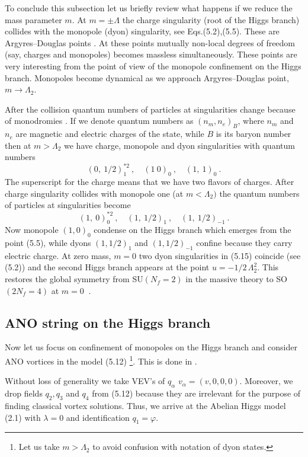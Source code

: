 \documentclass[a4paper,12pt]{article}
\begin{document}
To conclude this subsection let us briefly review what happens if
we reduce the mass parameter $m$. At $m=\pm\Lambda$ the charge
singularity (root of the Higgs branch) collides with the monopole
(dyon) singularity, see Eqs.(5.2),(5.5). These are
Argyres--Douglas points \cite{AD,APSW}. At these points mutually
non-\-local degrees of freedom (say, charges and monopoles)
becomes massless simultaneously. These points are very
interesting from the point of view of the monopole confinement on
the Higgs branch. Mono\-pol\-es become
dynamical as we approach Argyres--Douglas point, $m\to\Lambda_2$.

After the collision quantum numbers of particles at
singularities change because of monodromies \cite{SW2}. If we
denote quantum numbers as $(n_m,n_e)_B$, where $n_m$ and $n_e$
are magnetic and electric charges of the state, while $B$ is its
baryon number then at $m>\Lambda_2$ we have charge, monopole and
dyon singularities with quantum numbers
\begin{equation}
(0,\ 1/2)^{*2}_1\ , \quad (1\ 0)_0\ , \quad (1,\ 1)_0\ .
\end{equation}
The superscript for the charge means that we have two flavors
of charges. After charge singularity collides with monopole one
(at $m<\Lambda_2)$ the quantum numbers of particles at
singularities become \cite{BF}
\begin{equation}
(1,\ 0)^{*2}_0\ , \quad (1,\ 1/2)_1\ , \quad (1,\ 1/2)_{-1}\ .
\end{equation}
Now monopole $(1,0)_0$ condense on the Higgs branch which
emerges from the point (5.5), while dyons $(1,1/2)_1$ and
$(1,1/2)_{-1}$ confine because they carry electric
charge. At
zero mass, $m=0$ two dyon singularities in (5.15) coincide (see
(5.2)) and the second Higgs branch appears at the point
$u=-1/2\,\Lambda^2_2$. This restores the global symmetry from
SU$(N_f=2)$ in the massive theory to SO$(2N_f=4)$ at $m=0\ $
\cite{SW2}.

\subsection{ANO string on the Higgs branch}

Now let us focus on confinement of monopoles on the Higgs branch
and consider ANO vortices in the model (5.12) 
\footnote{ Let us take
$m>\Lambda_2$ to avoid confusion with notation of dyon states.}.
This is done in \cite{Y}.

Without loss of generality we take VEV's of $q_\alpha$
$v_\alpha=(v,0,0,0)$. Moreover, we drop fields $q_2,q_3$ and
$q_4$ from (5.12) because they are irrelevant for the purpose of
finding classical vortex solutions. Thus, we arrive at the
Abelian Higgs model (2.1) with $\lambda=0$ and identification
$q_1=\varphi$.
\end{document}
